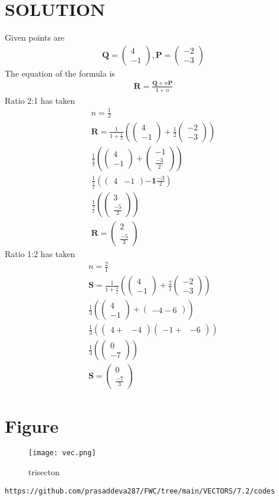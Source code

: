 \documentclass[12pt]{article}
\providecommand{\brak}[1]{\ensuremath{\left(#1\right)}}
\newcommand{\myvec}[1]{\ensuremath{\begin{pmatrix}#1\end{pmatrix}}}
\let\vec\mathbf
\begin{document}
\section{SOLUTION}
Given points are
\begin{align}
\vec{Q}=\myvec{4\\ -1} ,
\vec{P}=\myvec{-2\\ -3}
\end{align}
The equation of the formula is
\begin{align}
\vec{R}=\frac{\vec{Q}+n\vec{P}}{1+n}
\end{align}
Ratio 2:1 has taken 
\begin{align}
n=\frac{1}{2}\\
\vec{R}=\frac{1}{1+\frac{1}{2}}\brak{\myvec{4\\-1}+\frac{1}{2}\myvec{-2\\-3}}\\
\frac{1}{\frac{3}{2}}\brak{\myvec{4\\ -1}+\myvec{-1\\ \frac{-3}{2}}}\\
\frac{1}{\frac{3}{2}}\brak {\myvec{4&-1} {\vec{-1} \frac{-3}{2}}}\\
\frac{1}{\frac{3}{2}}\brak {\myvec{3\\ \frac{-5}{3}}}\\
\vec{R}=\myvec{2\\ \frac{-5}{3}}
\end{align}
Ratio 1:2 has taken
\begin{align}
n=\frac{2}{1}\\
\vec{S}=\frac{1}{1+\frac{2}{1}}\brak{\myvec{4\\-1}+\frac{2}{1}\myvec{-2\\-3}}\\
\frac{1}{3}\brak{\myvec{4\\ -1}+\myvec{-4-6}}\\
\frac{1}{3}\brak{\myvec{4+& -4}\myvec{-1+&-6}}\\
\frac{1}{3}\brak{\myvec{0\\ -7}}\\
\vec{S}=\myvec{0\\ \frac{-7}{3}}
\end{align}
\section{Figure}
\begin{figure}[h]
\centering
\texttt{[image: vec.png]}
\caption{trisecton}
		\label{fig:Figure}
\end{figure}
\begin{lstlisting}
https://github.com/prasaddeva287/FWC/tree/main/VECTORS/7.2/codes
\end{lstlisting}
\end{document}
